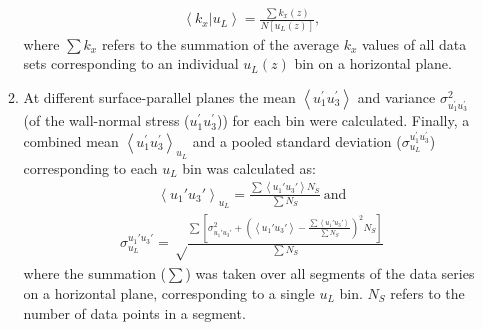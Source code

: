 \begin{enumerate}[(i)]
\begin{enumerate}[(1)]
    \begin{align}
        \left< k_x|u_L \right> = \frac{\sum k_x(z)}{N[u_L(z)]},
        \label{eq:kx_uL}
    \end{align} 
    where $\sum k_x$ refers to the summation of the average $k_x$ values of all data sets corresponding to an individual $u_L(z)$ bin on a horizontal plane. 
    \item At different surface-parallel planes the mean $\left < u_{1}^\prime u_{3}^\prime\right >$ and variance $\sigma^2_{u_{1}^\prime u_{3}^\prime}$ (of the wall-normal stress ($u_{1}^\prime u_{3}^\prime$)) for each bin were calculated. Finally, a combined mean $\left < u_{1}^\prime u_{3}^\prime \right >_{u_L}$ and a pooled standard deviation ($\sigma^{u_{1}^\prime u_{3}^\prime}_{u_L}$) corresponding to each $u_L$ bin was calculated as: 
    \begin{align}
      \left < u_{1}'u_{3}' \right >_{u_L} = \frac{\sum \left < u_{1}'u_{3}'\right > N_S}{\sum N_S} \ \text{and}
      \label{eq:u'w'_mean}
    \end{align}
    \begin{align}
      \sigma^{u_{1}'u_{3}'}_{u_L} = \sqrt \frac{\sum [\sigma^2_{u_{1}'u_{3}'} + (\left < u_{1}'u_{3}'\right > -\frac{\sum \left < u_{1}'u_{3}'\right >}{\sum N_S})^2 N_S]}{\sum N_S}
     \label{eq:std_uw} 
    \end{align}    
    where the summation ($\sum $) was taken over all segments of the data series on a horizontal plane, corresponding to a single $u_L$ bin. $N_S$ refers to the number of data points in a segment. 
 \end{enumerate}
\end{enumerate}


